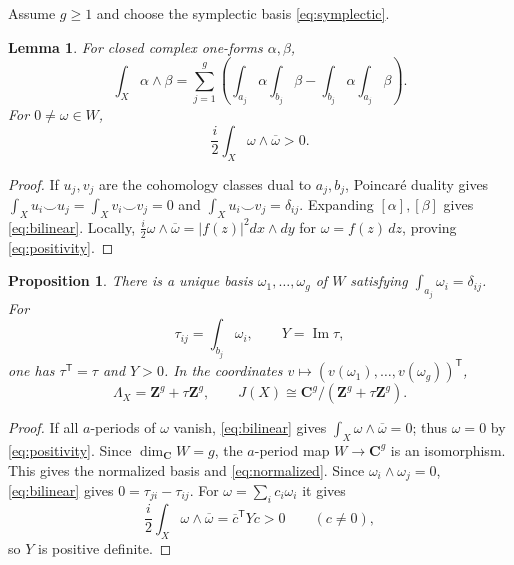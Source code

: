 \documentclass[11pt]{article}
\numberwithin{equation}{section}
\newtheorem{proposition}[theorem]{Proposition}
\newtheorem{lemma}[theorem]{Lemma}
\theoremstyle{definition}
\newcommand{\Z}{\mathbf Z}
\newcommand{\C}{\mathbf C}
\newcommand{\trans}{\mathsf T}
\begin{document}
Assume $g\geq1$ and choose the symplectic basis
\eqref{eq:symplectic}.

\begin{lemma}\label{lem:bilinear}
For closed complex one-forms $\alpha,\beta$,
\begin{equation}\label{eq:bilinear}
 \int_X\alpha\wedge\beta
 =\sum_{j=1}^g\left(
 \int_{a_j}\alpha\int_{b_j}\beta
 -\int_{b_j}\alpha\int_{a_j}\beta\right).
\end{equation}
For $0\neq\omega\in W$,
\begin{equation}\label{eq:positivity}
 \frac{i}{2}\int_X\omega\wedge\overline\omega>0.
\end{equation}
\end{lemma}

\begin{proof}
If $u_j,v_j$ are the cohomology classes dual to $a_j,b_j$, Poincar\'e
duality gives $\int_Xu_i\smile u_j=\int_Xv_i\smile v_j=0$ and
$\int_Xu_i\smile v_j=\delta_{ij}$. Expanding $[\alpha],[\beta]$ gives
\eqref{eq:bilinear}. Locally,
$\frac{i}{2}\omega\wedge\overline\omega=|f(z)|^2dx\wedge dy$
for $\omega=f(z)\,dz$, proving \eqref{eq:positivity}.
\end{proof}

\begin{proposition}\label{prop:periodmatrix}
There is a unique basis $\omega_1,\ldots,\omega_g$ of $W$ satisfying
$\int_{a_j}\omega_i=\delta_{ij}$. For
\[
 \tau_{ij}=\int_{b_j}\omega_i,\qquad Y=\operatorname{Im}\tau,
\]
one has $\tau^{\trans}=\tau$ and $Y>0$. In the coordinates
$v\mapsto(v(\omega_1),\ldots,v(\omega_g))^{\trans}$,
\begin{equation}\label{eq:normalized}
 \Lambda_X=\Z^g+\tau\Z^g,\qquad
 J(X)\cong\C^g/(\Z^g+\tau\Z^g).
\end{equation}
\end{proposition}

\begin{proof}
If all $a$-periods of $\omega$ vanish, \eqref{eq:bilinear} gives
$\int_X\omega\wedge\overline\omega=0$; thus $\omega=0$ by
\eqref{eq:positivity}. Since $\dim_{\C}W=g$, the $a$-period map
$W\to\C^g$ is an isomorphism. This gives the normalized basis and
\eqref{eq:normalized}. Since $\omega_i\wedge\omega_j=0$,
\eqref{eq:bilinear} gives $0=\tau_{ji}-\tau_{ij}$. For
$\omega=\sum_i c_i\omega_i$ it gives
\[
 \frac{i}{2}\int_X\omega\wedge\overline\omega
 =\overline c^{\trans}Yc>0\qquad(c\neq0),
\]
so $Y$ is positive definite.
\end{proof}
\end{document}
